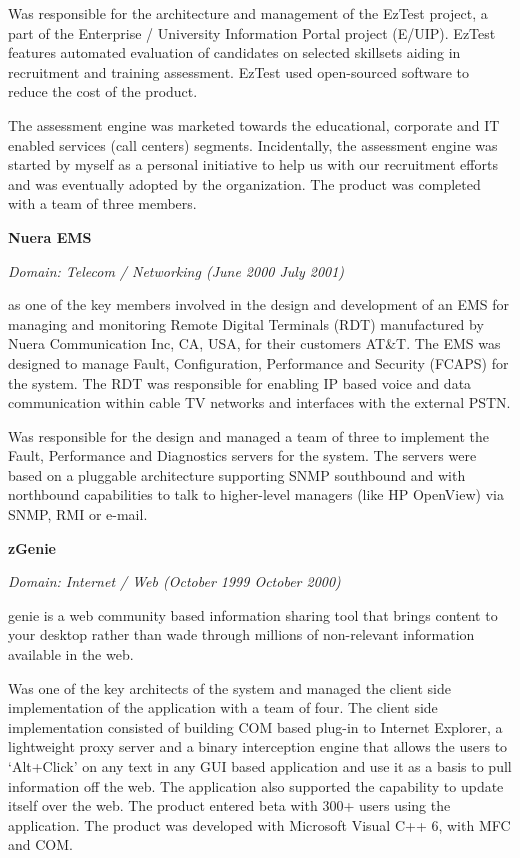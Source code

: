 \documentclass[a4paper,12pt]{article}
\newcommand\cvprojectentry[5]{
  \textbf{#1}
  
  \it{Domain: #2}\normalfont{} \quad (#3 \textendash #4)
  
}
\begin{document}
Was responsible for the architecture and management of the EzTest
project, a part of the Enterprise / University Information Portal
project (E/UIP). EzTest features automated evaluation of candidates on
selected skillsets aiding in recruitment and training
assessment. EzTest used open-sourced software to reduce the cost of
the product.
 
The assessment engine was marketed towards the educational, corporate
and IT enabled services (call centers) segments. Incidentally, the
assessment engine was started by myself as a personal initiative to
help us with our recruitment efforts and was eventually adopted by the
organization. The product was completed with a team of three members.
 
\cvprojectentry{Nuera EMS}{Telecom / Networking}{June 2000}{July 2001}

Was one of the key members involved in the design and development of
an EMS for managing and monitoring Remote Digital Terminals (RDT)
manufactured by Nuera Communication Inc, CA, USA, for their customers
AT\&T. The EMS was designed to manage Fault, Configuration, Performance
and Security (FCAPS) for the system. The RDT was responsible for
enabling IP based voice and data communication within cable TV
networks and interfaces with the external PSTN.
 
Was responsible for the design and managed a team of three to
implement the Fault, Performance and Diagnostics servers for the
system. The servers were based on a pluggable architecture supporting
SNMP southbound and with northbound capabilities to talk to
higher-level managers (like HP OpenView) via SNMP, RMI or e-mail.
 
\cvprojectentry{zGenie}{Internet / Web}{October 1999}{October 2000}

Zgenie is a web community based information sharing tool that brings
content to your desktop rather than wade through millions of
non-relevant information available in the web.
 
Was one of the key architects of the system and managed the client
side implementation of the application with a team of four. The client
side implementation consisted of building COM based plug-in to
Internet Explorer, a lightweight proxy server and a binary
interception engine that allows the users to `Alt+Click' on any text
in any GUI based application and use it as a basis to pull information
off the web. The application also supported the capability to update
itself over the web. The product entered beta with 300+ users using
the application. The product was developed with Microsoft Visual C++
6, with MFC and COM.
 
\end{document}
